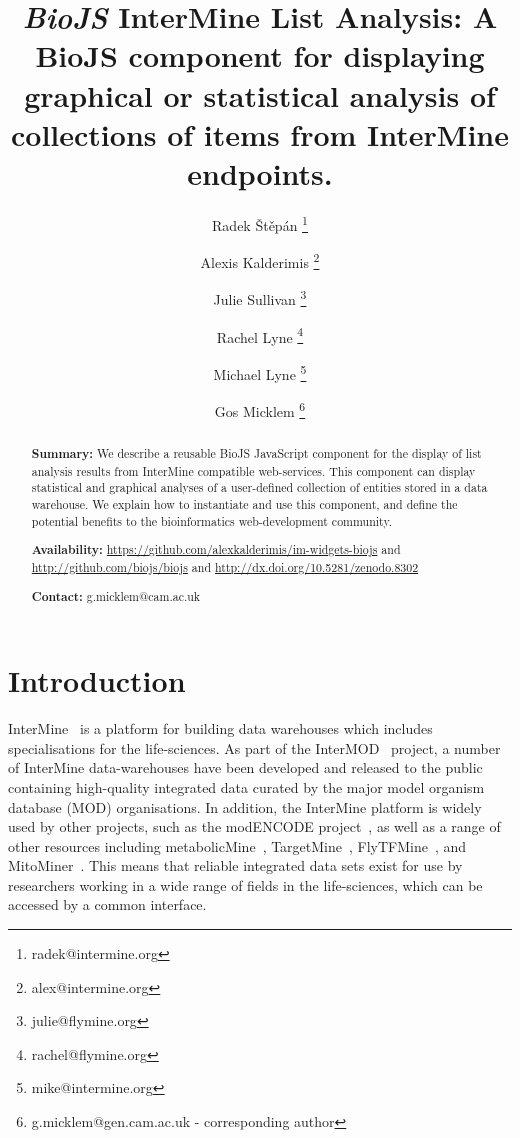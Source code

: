 \documentclass[10pt,a4paper,twocolumn]{article}
\begin{document}
\title{\textit{BioJS} InterMine List Analysis:
A BioJS component for displaying graphical or statistical analysis of
collections of items from InterMine endpoints.
}

\author[1]{Radek Štěpán \thanks{radek@intermine.org}}
\author[1]{Alexis Kalderimis \thanks{alex@intermine.org}}
\author[1]{Julie Sullivan \thanks{julie@flymine.org}}
\author[1]{Rachel Lyne \thanks{rachel@flymine.org}}
\author[1]{Michael Lyne \thanks{mike@intermine.org}}
\author[1]{Gos Micklem \thanks{g.micklem@gen.cam.ac.uk - corresponding author}}

\maketitle
\thispagestyle{fancy}

\begin{abstract}

\textbf{Summary:}
We describe a reusable BioJS JavaScript component for the display of list
analysis results from InterMine compatible web-services. This component can display
statistical and graphical analyses of a user-defined collection of entities stored
in a data warehouse. We explain how to instantiate and use this component, and
define the potential benefits to the bioinformatics web-development community.

\textbf{Availability:}
\url{https://github.com/alexkalderimis/im-widgets-biojs} and
\url{http://github.com/biojs/biojs} and
\url{http://dx.doi.org/10.5281/zenodo.8302}

\textbf{Contact:} g.micklem@cam.ac.uk

\end{abstract}
\clearpage

\section*{Introduction}

InterMine~\cite{intermine} is a platform for building data warehouses which
includes specialisations for the life-sciences. As part of the
InterMOD~\cite{intermod} project, a number of InterMine data-warehouses have
been developed and released to the public containing high-quality integrated
data curated by the major model organism database (MOD) organisations. In
addition, the InterMine platform is widely used by other projects, such as the
modENCODE project~\cite{contrino2012}, as well as a range of other resources
including metabolicMine~\cite{metabolicmine}, TargetMine~\cite{targetmine},
FlyTFMine~\cite{flytfmine}, and MitoMiner~\cite{mitominer}. This means that
reliable integrated data sets exist for use by researchers working in a wide
range of fields in the life-sciences, which can be accessed by a common
interface.
\end{document}
